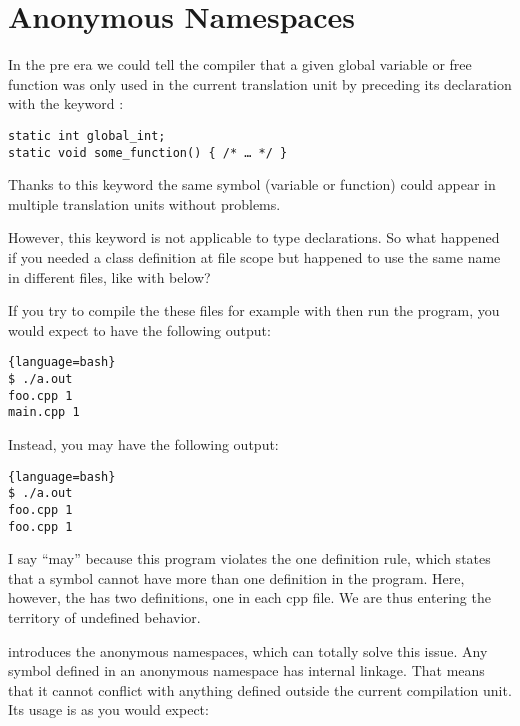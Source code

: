 \section{Anonymous Namespaces}

In the pre  era we could tell the compiler that a given global
variable or free function was only used in the current translation
unit by preceding its declaration with the keyword :

\begin{lstlisting}
static int global_int;
static void some_function() { /* … */ }
\end{lstlisting}

Thanks to this keyword the same symbol (variable or function) could
appear in multiple translation units without problems.

However, this keyword is not applicable to type declarations. So what
happened if you needed a class definition at file scope but happened
to use the same name in different files, like with 
below?




If you try to compile the these files for example with  then run the program, you would expect to have the
following output:

\begin{lstlisting}{language=bash}
$ ./a.out
foo.cpp 1
main.cpp 1
\end{lstlisting}

Instead, you may have the following output:

\begin{lstlisting}{language=bash}
$ ./a.out
foo.cpp 1
foo.cpp 1
\end{lstlisting}

I say ``may'' because this program violates the one definition rule,
which states that a symbol cannot have more than one definition in the
program. Here, however, the  has two definitions, one
in each cpp file. We are thus entering the territory of undefined
behavior.

\bigskip

 introduces the anonymous namespaces, which can totally solve
this issue. Any symbol defined in an anonymous namespace has internal
linkage. That means that it cannot conflict with anything defined
outside the current compilation unit. Its usage is as you would
expect:

